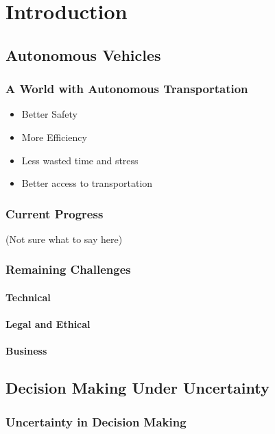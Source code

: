 \chapter{Introduction}

\section{Autonomous Vehicles}

\subsection{A World with Autonomous Transportation}

\begin{itemize}
    \item Better Safety
    \item More Efficiency
    \item Less wasted time and stress
    \item Better access to transportation
\end{itemize}

\subsection{Current Progress}

(Not sure what to say here)

\subsection{Remaining Challenges}

\subsubsection{Technical}
\subsubsection{Legal and Ethical}
\subsubsection{Business}

\section{Decision Making Under Uncertainty}

\subsection{Uncertainty in Decision Making}

